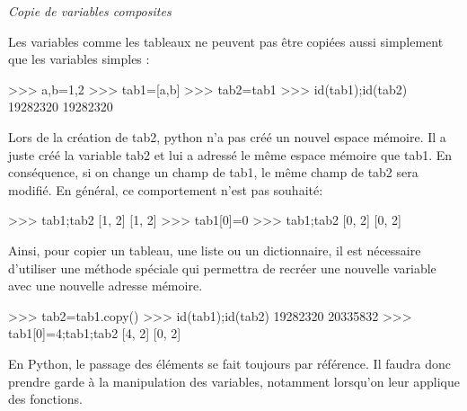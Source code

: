 \documentclass[10pt,fleqn]{article} %
\begin{document}
\begin{exemple}
\textit{Copie de variables composites}

Les variables comme les tableaux ne peuvent pas être copiées aussi simplement que les variables simples :


\begin{minipage}[c]{.55\linewidth}
\begin{py}
\begin{python}
>>> a,b=1,2
>>> tab1=[a,b]
>>> tab2=tab1
>>> id(tab1);id(tab2)
    19282320
    19282320
\end{python}
\end{py}
\end{minipage}

Lors de la création de tab2, python n'a pas créé un nouvel espace mémoire. Il a juste créé la variable tab2 et lui a adressé le même espace mémoire que tab1. En conséquence, si on change un champ de tab1, le même champ de tab2 sera modifié. En général, ce comportement n'est pas souhaité:

\begin{minipage}[c]{.55\linewidth}
\begin{py}
\begin{python}
>>> tab1;tab2
    [1, 2]
    [1, 2]
>>> tab1[0]=0
>>> tab1;tab2
    [0, 2]
    [0, 2]
\end{python}
\end{py}
\end{minipage}

Ainsi, pour copier un tableau, une liste ou un dictionnaire, il est nécessaire d'utiliser une méthode spéciale qui permettra de recréer une nouvelle variable avec une nouvelle adresse mémoire.


\begin{minipage}[c]{.55\linewidth}
\begin{py}
\begin{python}
>>> tab2=tab1.copy()
>>> id(tab1);id(tab2)
    19282320
    20335832
>>> tab1[0]=4;tab1;tab2
    [4, 2]
    [0, 2]
\end{python}
\end{py}
\end{minipage}\hfill
\begin{minipage}[c]{.3\linewidth}
\end{minipage}

\end{exemple}


\begin{rem}
En Python, le passage des éléments se fait toujours par référence. Il faudra donc prendre garde à la manipulation des variables, notamment lorsqu'on leur applique des fonctions. 
 
\end{rem}
\end{document}
